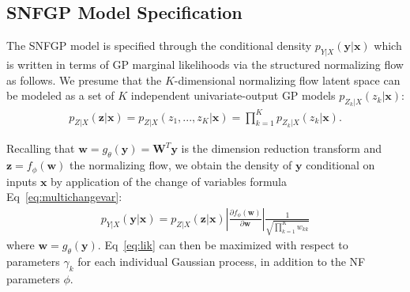 \documentclass[letterpaper]{article} %
\begin{document}
\subsection{SNFGP Model Specification}
The SNFGP model is specified through the conditional density $p_{Y|X}(\mathbf{y}|\mathbf{x})$ which is written in terms of GP marginal likelihoods via the structured normalizing flow as follows.
We presume that the $K$-dimensional normalizing flow latent space can be modeled as a set of $K$ independent univariate-output GP models $p_{Z_k|X}(z_k | \mathbf{x})$:
\begin{align}
p_{Z|X}(\mathbf{z} | \mathbf{x}) = p_{Z|X}(z_1, ..., z_K | \mathbf{x}) = \prod_{k=1}^K p_{Z_k|X}(z_k | \mathbf{x}).
\end{align}

Recalling that $\mathbf{w} = g_\theta(\mathbf{y}) = \mathbf{W}^T\mathbf{y}$ is the dimension reduction transform and $\mathbf{z} = f_\phi(\mathbf{w})$ the normalizing flow, we obtain the density of $\mathbf{y}$ conditional on inputs $\mathbf{x}$ by application of the change of variables formula Eq~\ref{eq:multichangevar}:
\begin{align}
p_{Y|X}(\mathbf{y} | \mathbf{x}) = p_{Z|X}(\mathbf{z} | \mathbf{x}) \left| \frac{\partial f_\phi(\mathbf{w})}{\partial \mathbf{w}} \right|\frac{1}{\sqrt{\prod_{k=1}^K w_{kk} }} \label{eq:lik}
\end{align}
where $\mathbf{w} = g_\theta(\mathbf{y})$.
Eq~\ref{eq:lik} can then be maximized with respect to parameters $\gamma_k$ for each individual Gaussian process, in addition to the NF parameters $\phi$.
\end{document}
